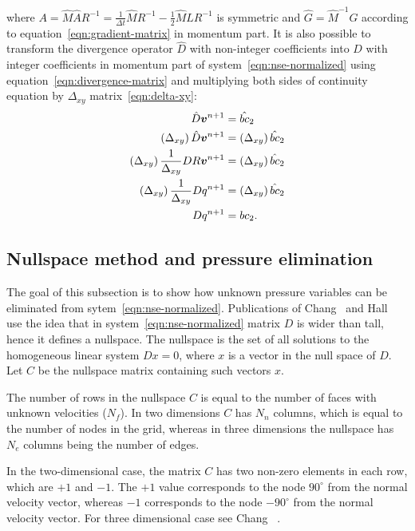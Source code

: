 \documentclass{article}
\begin{document}
where $A=\hat{M}\hat{A}R^{-1}=\frac{1}{\Delta t}\hat{M}R^{-1}-\frac{1}{2}\hat{M}\hat{L}R^{-1}$ is symmetric and $\hat{G}=\hat{M}^{-1}G$ according to equation~\eqref{eqn:gradient-matrix} in momentum part. It is also possible to transform the divergence operator $\hat{D}$ with non-integer coefficients into $D$ with integer coefficients in momentum part of system~\eqref{eqn:nse-normalized} using  equation~\eqref{eqn:divergence-matrix} and multiplying both sides of continuity equation by $\Delta _{xy}$ matrix~\eqref{eqn:delta-xy}: 
\begin{align*}
	\hat{D}\boldsymbol{v}^{n+1}&= \hat{bc}_2\notag\\
	\left(\Delta_{xy} \right)\hat{D}\boldsymbol{v}^{n+1}&=\left ( \Delta_{xy}\right ) \hat{bc}_2\notag\\
	\left(\Delta_{xy}\right)\frac{1}{\Delta _{xy}}{D}R\boldsymbol{v}^{n+1}&=\left ( \Delta_{xy}\right ) \hat{bc}_2\notag\\
	\left(\Delta_{xy}\right)\frac{1}{\Delta_{xy}}{D}q^{n+1}&=\left ( \Delta_{xy}\right ) \hat{bc}_2\notag\\
	D{q}^{n+1}&=bc_2.
\end{align*}

\subsection{Nullspace method and pressure elimination}\label{sec:nullspace-method}

The goal of this subsection is to show how unknown pressure variables can be eliminated from sytem~\eqref{eqn:nse-normalized}. Publications of Chang~\cite{Chang:2002} and Hall~\cite{Hall:1980} use the idea that in system~\eqref{eqn:nse-normalized} matrix $D$ is wider than tall, hence it defines a nullspace. The nullspace is the set of all solutions to the homogeneous linear system $Dx = 0$, where $x$ is a vector in the null space of $D$. Let $C$ be the nullspace matrix containing such vectors $x$. 

The number of rows in the nullspace $C$ is equal to the number of faces with unknown velocities ($N_f$). In two dimensions $C$ has $N_n$ columns, which is equal to the number of nodes in the grid, whereas in three dimensions the nullspace has $N_e$ columns being the number of edges. 

In the two-dimensional case, the matrix $C$ has two non-zero elements in each row, which are $+1$ and $-1$. The $+1$ value corresponds to the node $90^\circ$ from the normal velocity vector, whereas $-1$ corresponds to the node $-90^\circ$ from the normal velocity vector.  For three dimensional case see Chang ~\cite{Chang:2002}.
\end{document}
